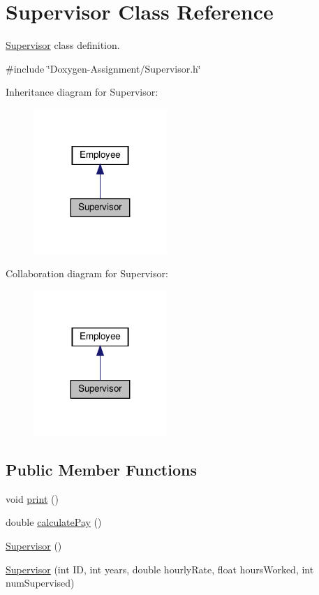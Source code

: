 \hypertarget{classSupervisor}{}\section{Supervisor Class Reference}
\label{classSupervisor}


\hyperlink{classSupervisor}{Supervisor} class definition.  




{\ttfamily \#include \char`\"{}Doxygen-\/\+Assignment/\+Supervisor.\+h\char`\"{}}



Inheritance diagram for Supervisor\+:
\nopagebreak
\begin{figure}[H]
\begin{center}
\leavevmode
\includegraphics[width=143pt]{classSupervisor__inherit__graph}
\end{center}
\end{figure}


Collaboration diagram for Supervisor\+:
\nopagebreak
\begin{figure}[H]
\begin{center}
\leavevmode
\includegraphics[width=143pt]{classSupervisor__coll__graph}
\end{center}
\end{figure}
\subsection*{Public Member Functions}
\begin{DoxyCompactItemize}
\item 
void \hyperlink{classSupervisor_a92483dc9a54904d79b46c6ec4efb3f54}{print} ()
\item 
double \hyperlink{classSupervisor_aa37daa89523c08b84ae8141299e036f8}{calculate\+Pay} ()
\item 
\hyperlink{classSupervisor_a9d7eafc36b5429092ba0f758bc7841c4}{Supervisor} ()
\item 
\hyperlink{classSupervisor_a02d9245744652deb20e9408001d6ed3b}{Supervisor} (int ID, int years, double hourly\+Rate, float hours\+Worked, int num\+Supervised)
\end{DoxyCompactItemize}
